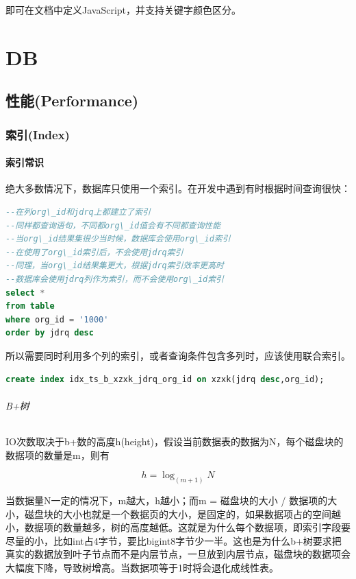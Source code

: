 \documentclass[letter]{book}
\begin{document}
即可在文档中定义JavaScript，并支持关键字颜色区分。

\part{DB}

\chapter{性能(Performance)}

\section{索引(Index)}

\subsection{索引常识}

绝大多数情况下，数据库只使用一个索引。在开发中遇到有时根据时间查询很快：

\begin{lstlisting}[language=SQL]
--在列org\_id和jdrq上都建立了索引
--同样都查询语句，不同都org\_id值会有不同都查询性能
--当org\_id结果集很少当时候，数据库会使用org\_id索引
--在使用了org\_id索引后，不会使用jdrq索引
--同理，当org\_id结果集更大，根据jdrq索引效率更高时
--数据库会使用jdrq列作为索引，而不会使用org\_id索引
select *
from table
where org_id = '1000'
order by jdrq desc
\end{lstlisting}

所以需要同时利用多个列的索引，或者查询条件包含多列时，应该使用联合索引。

\begin{lstlisting}[language=SQL]
create index idx_ts_b_xzxk_jdrq_org_id on xzxk(jdrq desc,org_id);
\end{lstlisting}

\paragraph{B+树}

IO次数取决于b+数的高度h(height)，假设当前数据表的数据为N，每个磁盘块的数据项的数量是m，则有

\begin{equation}
h=\log_{(m+1)} N
\end{equation}


当数据量N一定的情况下，m越大，h越小；而m = 磁盘块的大小 / 数据项的大小，磁盘块的大小也就是一个数据页的大小，是固定的，如果数据项占的空间越小，数据项的数量越多，树的高度越低。这就是为什么每个数据项，即索引字段要尽量的小，比如int占4字节，要比bigint8字节少一半。这也是为什么b+树要求把真实的数据放到叶子节点而不是内层节点，一旦放到内层节点，磁盘块的数据项会大幅度下降，导致树增高。当数据项等于1时将会退化成线性表。
\end{document}
